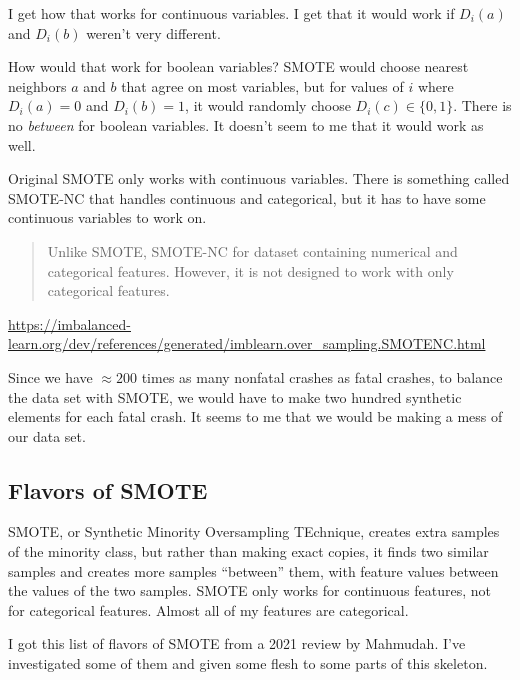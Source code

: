 I get how that works for continuous variables.  I get that it would work if $D_i(a)$ and $D_i(b)$ weren't very different.  

How would that work for boolean variables?  SMOTE would choose nearest neighbors $a$ and $b$ that agree on most variables, but for values of $i$ where $D_i(a)=0$ and $D_i(b)=1$, it would randomly choose $D_i(c) \in \{0,1\}$.  There is no {\it between} for boolean variables.  It doesn't seem to me that it would work as well.  

Original SMOTE only works with continuous variables.  There is something called SMOTE-NC that handles continuous and categorical, but it has to have some continuous variables to work on.  

\begin{quote}
Unlike SMOTE, SMOTE-NC for dataset containing numerical and categorical features. However, it is not designed to work with only categorical features.
\end{quote}

\url{https://imbalanced-learn.org/dev/references/generated/imblearn.over_sampling.SMOTENC.html}

Since we have $\approx 200$ times as many nonfatal crashes as fatal crashes, to balance the data set with SMOTE, we would have to make two hundred synthetic elements for each fatal crash.  It seems to me that we would be making a mess of our data set.  
		


\subsection{Flavors of SMOTE}

SMOTE, or Synthetic Minority Oversampling TEchnique, 			\cite{CHAWLA_2002}
 creates extra samples of the minority class, but rather than making exact copies, it finds two similar samples and creates more samples ``between'' them, with feature values between the values of the two samples.  SMOTE only works for continuous features, not for categorical features.  Almost all of my features are categorical.  
 
 I got this list of flavors of SMOTE from a 2021 review by Mahmudah.
			\cite{MAHMUDAH_2021}  I've investigated some of them and given some flesh to some parts of this skeleton.
 
